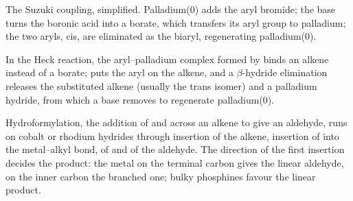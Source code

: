 \begin{omfigure}

{\small The Suzuki coupling, simplified. Palladium(0) adds the aryl bromide; the base
turns the boronic acid into a borate, which transfers its aryl group to palladium; the two
aryls, cis, are eliminated as the biaryl, regenerating palladium(0).}
\end{omfigure}

In the Heck reaction, the aryl--palladium complex formed by  binds an
alkene instead of a borate;  puts the aryl on the alkene, and a
$\beta$-hydride elimination releases the substituted alkene (usually the trans isomer)
and a palladium hydride, from which a base removes  to regenerate palladium(0).

Hydroformylation, the addition of  and  across an alkene to give an aldehyde,
runs on cobalt or rhodium hydrides through insertion of the alkene, insertion of 
into the metal--alkyl bond,  of  and  of the
aldehyde. The direction of the first insertion decides the product: the metal on the
terminal carbon gives the linear aldehyde, on the inner carbon the branched one; bulky
phosphines favour the linear product.

